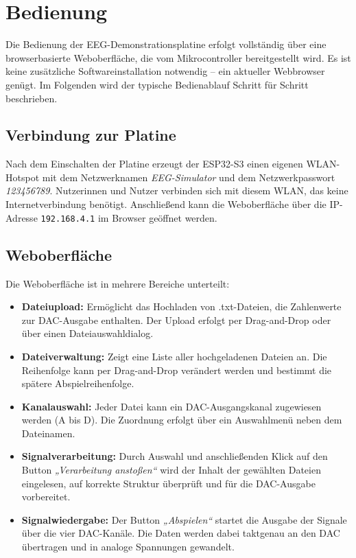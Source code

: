 \chapter{Bedienung}
\label{chap:bedienung}

Die Bedienung der EEG-Demonstrationsplatine erfolgt vollständig über eine browserbasierte Weboberfläche, die vom Mikrocontroller bereitgestellt wird. Es ist keine zusätzliche Softwareinstallation notwendig – ein aktueller Webbrowser genügt. Im Folgenden wird der typische Bedienablauf Schritt für Schritt beschrieben.

\section{Verbindung zur Platine}

Nach dem Einschalten der Platine erzeugt der ESP32-S3 einen eigenen WLAN-Hotspot mit dem Netzwerknamen \textit{EEG-Simulator} und dem Netzwerkpasswort \textit{123456789}.
Nutzerinnen und Nutzer verbinden sich mit diesem WLAN, das keine Internetverbindung benötigt. Anschließend kann die Weboberfläche über die IP-Adresse \texttt{192.168.4.1} im Browser geöffnet werden.



\section{Weboberfläche}

Die Weboberfläche ist in mehrere Bereiche unterteilt:

\begin{itemize}
  \item \textbf{Dateiupload:} Ermöglicht das Hochladen von .txt-Dateien, die Zahlenwerte zur DAC-Ausgabe enthalten. Der Upload erfolgt per Drag-and-Drop oder über einen Dateiauswahldialog.
  \item \textbf{Dateiverwaltung:} Zeigt eine Liste aller hochgeladenen Dateien an. Die Reihenfolge kann per Drag-and-Drop verändert werden und bestimmt die spätere Abspielreihenfolge.
  \item \textbf{Kanalauswahl:} Jeder Datei kann ein DAC-Ausgangskanal zugewiesen werden (A bis D). Die Zuordnung erfolgt über ein Auswahlmenü neben dem Dateinamen.
  \item \textbf{Signalverarbeitung:} Durch Auswahl und anschließenden Klick auf den Button \textit{„Verarbeitung anstoßen“} wird der Inhalt der gewählten Dateien eingelesen, auf korrekte Struktur überprüft und für die DAC-Ausgabe vorbereitet.
  \item \textbf{Signalwiedergabe:} Der Button \textit{„Abspielen“} startet die Ausgabe der Signale über die vier DAC-Kanäle. Die Daten werden dabei taktgenau an den DAC übertragen und in analoge Spannungen gewandelt.
\end{itemize}

